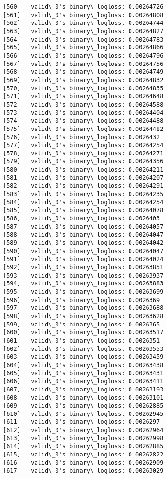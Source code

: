 \documentclass[11pt]{article}
\begin{document}
\begin{Verbatim}[commandchars=\\\{\}]
[560]	valid\_0's binary\_logloss: 0.00264726
[561]	valid\_0's binary\_logloss: 0.00264808
[562]	valid\_0's binary\_logloss: 0.00264744
[563]	valid\_0's binary\_logloss: 0.00264827
[564]	valid\_0's binary\_logloss: 0.00264783
[565]	valid\_0's binary\_logloss: 0.00264866
[566]	valid\_0's binary\_logloss: 0.00264796
[567]	valid\_0's binary\_logloss: 0.00264756
[568]	valid\_0's binary\_logloss: 0.00264749
[569]	valid\_0's binary\_logloss: 0.00264832
[570]	valid\_0's binary\_logloss: 0.00264835
[571]	valid\_0's binary\_logloss: 0.00264648
[572]	valid\_0's binary\_logloss: 0.00264588
[573]	valid\_0's binary\_logloss: 0.00264404
[574]	valid\_0's binary\_logloss: 0.00264488
[575]	valid\_0's binary\_logloss: 0.00264482
[576]	valid\_0's binary\_logloss: 0.0026432
[577]	valid\_0's binary\_logloss: 0.00264254
[578]	valid\_0's binary\_logloss: 0.00264271
[579]	valid\_0's binary\_logloss: 0.00264356
[580]	valid\_0's binary\_logloss: 0.00264211
[581]	valid\_0's binary\_logloss: 0.00264207
[582]	valid\_0's binary\_logloss: 0.00264291
[583]	valid\_0's binary\_logloss: 0.00264235
[584]	valid\_0's binary\_logloss: 0.00264254
[585]	valid\_0's binary\_logloss: 0.00264078
[586]	valid\_0's binary\_logloss: 0.0026403
[587]	valid\_0's binary\_logloss: 0.00264057
[588]	valid\_0's binary\_logloss: 0.00264047
[589]	valid\_0's binary\_logloss: 0.00264042
[590]	valid\_0's binary\_logloss: 0.00264047
[591]	valid\_0's binary\_logloss: 0.00264024
[592]	valid\_0's binary\_logloss: 0.00263851
[593]	valid\_0's binary\_logloss: 0.00263937
[594]	valid\_0's binary\_logloss: 0.00263883
[595]	valid\_0's binary\_logloss: 0.00263699
[596]	valid\_0's binary\_logloss: 0.0026369
[597]	valid\_0's binary\_logloss: 0.00263688
[598]	valid\_0's binary\_logloss: 0.00263628
[599]	valid\_0's binary\_logloss: 0.0026365
[600]	valid\_0's binary\_logloss: 0.00263517
[601]	valid\_0's binary\_logloss: 0.0026351
[602]	valid\_0's binary\_logloss: 0.00263553
[603]	valid\_0's binary\_logloss: 0.00263459
[604]	valid\_0's binary\_logloss: 0.00263438
[605]	valid\_0's binary\_logloss: 0.00263431
[606]	valid\_0's binary\_logloss: 0.00263411
[607]	valid\_0's binary\_logloss: 0.00263193
[608]	valid\_0's binary\_logloss: 0.00263101
[609]	valid\_0's binary\_logloss: 0.00262885
[610]	valid\_0's binary\_logloss: 0.00262945
[611]	valid\_0's binary\_logloss: 0.0026297
[612]	valid\_0's binary\_logloss: 0.00262964
[613]	valid\_0's binary\_logloss: 0.00262998
[614]	valid\_0's binary\_logloss: 0.00262885
[615]	valid\_0's binary\_logloss: 0.00262822
[616]	valid\_0's binary\_logloss: 0.00262909
[617]	valid\_0's binary\_logloss: 0.00263029

\end{Verbatim}
\end{document}
